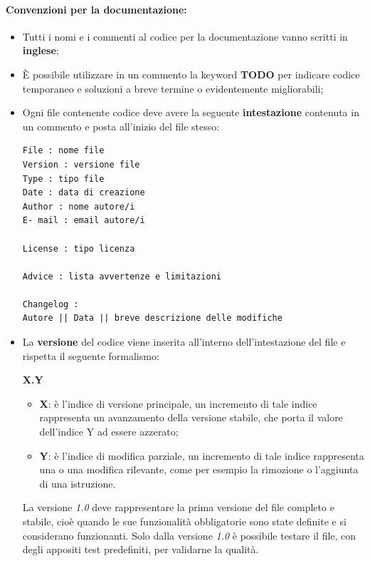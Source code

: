 \documentclass[NormeDiProgetto.tex]{subfiles}
\begin{document}
\paragraph*{Convenzioni per la documentazione: }
\begin{itemize}
	\item Tutti i nomi e i commenti al codice per la documentazione vanno scritti in \textbf{inglese};
	\item \`{E} possibile utilizzare in un commento la keyword \textbf{TODO} per indicare codice temporaneo e soluzioni a breve termine o evidentemente migliorabili;
	\item Ogni file contenente codice deve avere la seguente \textbf{intestazione} contenuta in un commento e posta all'inizio del file stesso:
\begin{center}{
\begin{minipage}{12cm}
\begin{Verbatim}[frame=single]
File : nome file
Version : versione file
Type : tipo file
Date : data di creazione
Author : nome autore/i
E- mail : email autore/i

License : tipo licenza

Advice : lista avvertenze e limitazioni

Changelog :
Autore || Data || breve descrizione delle modifiche
\end{Verbatim}
\end{minipage}
}
\end{center}
	\item La \textbf{versione} del codice viene inserita all'interno dell'intestazione del file e rispetta il
	seguente formalismo:
	\begin{center}{\textbf{X.Y}}\end{center}	
	\begin{itemize}
		\item \textbf{X}: è l'indice di versione principale, un incremento di tale indice rappresenta un avanzamento della versione stabile, che porta il valore dell'indice Y ad essere azzerato;
		\item \textbf{Y}: è l'indice di modifica parziale, un incremento di tale indice rappresenta una  o una modifica rilevante, come per esempio la rimozione o l'aggiunta di una istruzione.
	\end{itemize}
	La versione \textit{1.0} deve rappresentare la prima versione del file completo e stabile, cioè quando le sue funzionalità obbligatorie sono state definite e si considerano funzionanti. Solo dalla versione \textit{1.0} è possibile testare il file, con degli appositi test predefiniti, per validarne la qualità.
\end{itemize}






\end{document}

